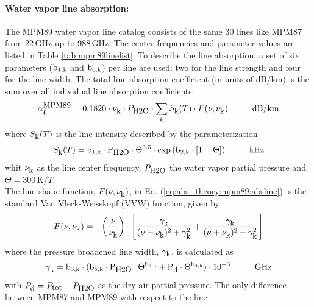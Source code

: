 \paragraph{Water vapor line absorption:}
\label{levele:mpm89_h2olines}
The MPM89 water vapor line catalog consists of the same 30 lines 
like MPM87 from 22\,GHz up to 988\,GHz. The center frequencies and parameter 
values are listed in Table \ref{tab:mpm89linelist}. To describe the line 
absorption, a set of six parameters ($\rm b_{\rm 1,k}$ and $\rm b_{\rm 6,k}$) per line are used: two 
for the line strength and four for the line width. The total line 
absorption coefficient (in units of dB/km) is the sum over all
individual line absorption coefficients:
\begin{equation}
  \label{eq:abs_theory:mpm89:absline}
  \alphampmml = 0.1820 \cdot \nuk \cdot \phzo \cdot 
  \sum_{k}{\inten \cdot \shape}\hspace*{10mm}\mbox{dB/km}
\end{equation}
where $S_{\mbox{\rm \small k}}(T)$ is the line intensity described by the parameterization
\begin{equation}
  \label{eq:abs_theory:mpm89:strength}
  \inten = \bek \cdot \phzo \cdot \Theta^{3.5} 
           \cdot \exp{(\bzk \cdot [1-\Theta])}\hspace*{10mm}\mbox{kHz}
\end{equation}
whit $\nu_{\mbox{\rm \small k}}$ as the line center frequency, $P_{\mbox{\rm \small H2O}}$ the water
vapor partial pressure and $\Theta = 300\,\mbox{K}/T$.\\
The line shape function, $F(\nu,\nu_{\mbox{\rm \small k}})$, in Eq. (\ref{eq:abs_theory:mpm89:absline}) 
is the standard Van Vleck-Weisskopf (VVW) function, given by 
\begin{eqnarray}
  \label{eq:abs_theory:mpm89:VVW}
  F(\nu,\nu_{\mbox{\rm \small k}}) & = & \left(\frac{\nu}{\nu_{\mbox{\rm \small k}}}\right) \cdot 
               \left[\frac{\gamma_{\mbox{\rm \small k}}}{(\nu - \nu_{\mbox{\rm \small k}})^2 + \gamma_{\mbox{\rm \small k}}^2} + 
                     \frac{\gamma_{\mbox{\rm \small k}}}{(\nu + \nu_{\mbox{\rm \small k}})^2 + \gamma_{\mbox{\rm \small k}}^2}\right]
\end{eqnarray}
where the pressure broadened line width, $\gamma_{\mbox{\rm \small k}}$, is calculated as
\begin{equation}
  \label{eq:abs_theory:mpm89:gamma}
  \gamk = \bdk \cdot 
         (\bfk \cdot \phzo \cdot \Theta^{\bsk} + 
                     \pda  \cdot \Theta^{\bvk})
        \cdot 10^{-3}\hspace*{10mm}\mbox{GHz}
\end{equation}
with $P_{\mbox{\rm \small d}}=P_{\mbox{\rm \small tot}}-P_{\mbox{\rm \small H2O}}$ as the dry air partial pressure. 
The only difference between MPM87 and MPM89 with respect to the line 
